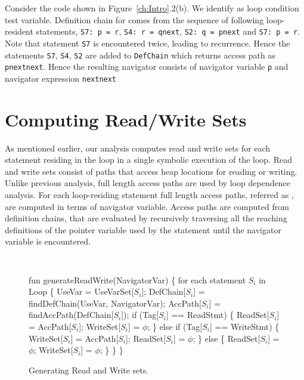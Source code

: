\begin{example}{\rm
Consider the code shown in Figure~\ref{ch:Intro}.2(b). We identify 
 as loop condition test variable. Definition chain for  comes from the sequence of following loop-resident statements, 
{\tt S7: p = r}, {\tt S4: r = q\rtarrow next}, {\tt S2: q = p\rtarrow next} and {\tt S7: p = r}. Note that statement {\tt S7} is
encountered twice, leading to recurrence. Hence the statements {\tt S7}, {\tt S4}, {\tt S2} are added to {\tt DefChain} which returns 
access path as {\tt p\rtarrow next\rtarrow next}. Hence the resulting navigator consists of navigator variable {\tt p} and navigator expression 
{\tt next\rtarrow next}
}
\hfill\psframebox{}  \end{example}
\section{Computing Read/Write Sets}
As mentioned earlier, our analysis computes read and 
write sets for each statement residing in the loop in 
a single symbolic execution of the loop. Read and write sets 
consist of paths that access heap locations for reading or writing. Unlike previous analysis, 
full length access paths are used by loop dependence analysis. For each 
loop-residing statement full length access paths, referred as , 
are computed in terms of navigator variable. Access paths  
are computed from definition chains, that are evaluated by recursively 
traversing all the reaching definitions of the pointer variable 
used by the statement until 
the navigator variable is encountered. 

\begin{figure}
\begin{framed}
{\tt
  \begin{program}{0}
  \FL fun generateReadWrite(NavigatorVar)  \{
   for each statement $S_i$ in Loop \{
   UseVar = UseVarSet[$S_i$];
   DefChain[$S_i$] = findDefChain(UseVar, NavigatorVar);
   AccPath[$S_i$] = findAccPath(DefChain[$S_i$]);
   if (Tag[$S_i$] == ReadStmt) \{
   ReadSet[$S_i$] = AccPath[$S_i$];
   WriteSet[$S_i$] = $\phi$;
   \}
    else if (Tag[$S_i$] == WriteStmt) \{
   WriteSet[$S_i$] = AccPath[$S_i$];
   ReadSet[$S_i$] = $\phi$;
   \}
    else \{
   ReadSet[$S_i$] = $\phi$;
   WriteSet[$S_i$] = $\phi$;
   \}
   \}
   \}
  \end{program}
}
\end{framed}
  \caption{Generating Read and Write sets. \label{fig:algoReadWrite}}
\end{figure}

